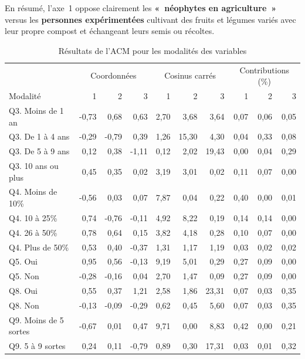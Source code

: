 \documentclass[
  11pt,
  french,
]{book}
\begin{document}
En résumé, l'axe~1 oppose clairement les \textbf{«~néophytes en agriculture~»} versus les \textbf{personnes expérimentées} cultivant des fruits et légumes variés avec leur propre compost et échangeant leurs semis ou récoltes.

\begin{table}

\caption{\label{tab:ACMValeursCoordTab}Résultats de l'ACM pour les modalités des variables}
\centering
\fontsize{8}{10}\selectfont
\begin{tabular}[t]{lrrrrrrrrr}
\toprule
\multicolumn{1}{c}{ } & \multicolumn{3}{c}{Coordonnées} & \multicolumn{3}{c}{Cosinus carrés} & \multicolumn{3}{c}{Contributions (\%)} \\
\cmidrule(l{3pt}r{3pt}){2-4} \cmidrule(l{3pt}r{3pt}){5-7} \cmidrule(l{3pt}r{3pt}){8-10}
Modalité & 1 & 2 & 3 & 1 & 2 & 3 & 1 & 2 & 3\\
\midrule
Q3. Moins de 1 an & -0,73 & 0,68 & 0,63 & 2,70 & 3,68 & 3,64 & 0,07 & 0,06 & 0,05\\
Q3. De 1 à 4 ans & -0,29 & -0,79 & 0,39 & 1,26 & 15,30 & 4,30 & 0,04 & 0,33 & 0,08\\
Q3. De 5 à 9 ans & 0,12 & 0,38 & -1,11 & 0,12 & 2,02 & 19,43 & 0,00 & 0,04 & 0,29\\
Q3. 10 ans ou plus & 0,45 & 0,35 & 0,02 & 3,19 & 3,01 & 0,02 & 0,11 & 0,07 & 0,00\\
Q4. Moins de 10\% & -0,56 & 0,03 & 0,07 & 7,87 & 0,04 & 0,22 & 0,40 & 0,00 & 0,01\\
\addlinespace
Q4. 10 à 25\% & 0,74 & -0,76 & -0,11 & 4,92 & 8,22 & 0,19 & 0,14 & 0,14 & 0,00\\
Q4. 26 à 50\% & 0,78 & 0,64 & 0,15 & 3,82 & 4,18 & 0,28 & 0,10 & 0,07 & 0,00\\
Q4. Plus de 50\% & 0,53 & 0,40 & -0,37 & 1,31 & 1,17 & 1,19 & 0,03 & 0,02 & 0,02\\
Q5. Oui & 0,95 & 0,56 & -0,13 & 9,19 & 5,01 & 0,29 & 0,27 & 0,09 & 0,00\\
Q5. Non & -0,28 & -0,16 & 0,04 & 2,70 & 1,47 & 0,09 & 0,27 & 0,09 & 0,00\\
\addlinespace
Q8. Oui & 0,55 & 0,37 & 1,21 & 2,58 & 1,86 & 23,31 & 0,07 & 0,03 & 0,35\\
Q8. Non & -0,13 & -0,09 & -0,29 & 0,62 & 0,45 & 5,60 & 0,07 & 0,03 & 0,35\\
Q9. Moins de 5 sortes & -0,67 & 0,01 & 0,47 & 9,71 & 0,00 & 8,83 & 0,42 & 0,00 & 0,21\\
Q9. 5 à 9 sortes & 0,24 & 0,11 & -0,79 & 0,89 & 0,30 & 17,31 & 0,03 & 0,01 & 0,32\\

\end{tabular}
\end{table}
\end{document}
